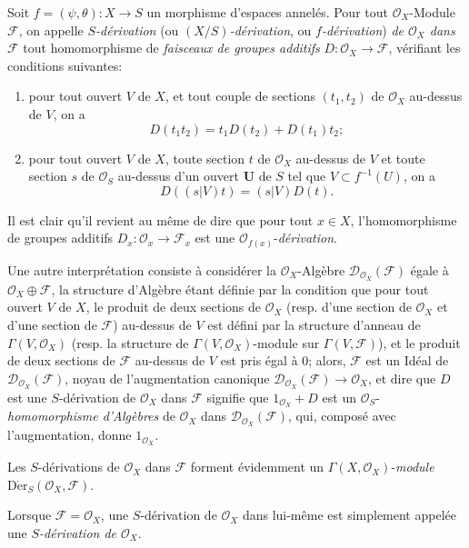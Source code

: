 \begin{env}[16.5.1]
Soit $f=(\psi,\theta):X\to S$ un morphisme d'espaces annelés. Pour tout
$\mathcal{O}_X$-Module $\mathscr{F}$, on appelle \emph{$S$-dérivation}
(ou \emph{$(X/S)$-dérivation}, ou \emph{$f$-dérivation}) \emph{de
$\mathcal{O}_X$ dans $\mathscr{F}$} tout homomorphisme de \emph{faisceaux de
groupes additifs} $D:\mathcal{O}_X\to\mathscr{F}$, vérifiant les conditions
suivantes:
\begin{enumerate}
\item[\emph{a)}] pour tout ouvert $V$ de $X$, et tout couple de sections
$(t_1,t_2)$ de $\mathcal{O}_X$ au-dessus de $V$, on a
\[
  D(t_1t_2)=t_1D(t_2)+D(t_1)t_2;
  \tag{16.5.1.1}
  \label{IV.16.5.1.1}
\]
\item[\emph{b)}] pour tout ouvert $V$ de $X$, toute section $t$ de $\mathcal{O}_X$
au-dessus de $V$ et toute section $s$ de $\mathcal{O}_S$ au-dessus d'un ouvert
$\mathbf{U}$ de $S$ tel que $V\subset f^{-1}(U)$, on a
\[
  D((s|V)t)=(s|V)D(t).
  \tag{16.5.1.2}
  \label{IV.16.5.1.2}
\]
\end{enumerate}

Il est clair qu'il revient au même de dire que pour tout $x\in X$,
l'homomorphisme de groupes additifs
$D_x:\mathcal{O}_x\to\mathscr{F}_x$ est une
$\mathcal{O}_{f(x)}$-\emph{dérivation}.

Une autre interprétation consiste à considérer la $\mathcal{O}_X$-Algèbre
$\mathscr{D}_{\mathcal{O}_X}(\mathscr{F})$ égale à
$\mathcal{O}_X\oplus\mathscr{F}$, la structure d'Algèbre étant définie par la
condition que pour tout ouvert $V$ de $X$, le produit de deux sections de
$\mathcal{O}_X$ (resp. d'une section de $\mathcal{O}_X$ et d'une section de
$\mathscr{F}$) au-dessus de $V$ est défini par la structure d'anneau de
$\Gamma(V,\mathcal{O}_X)$ (resp. la structure de
$\Gamma(V,\mathcal{O}_X)$-module sur $\Gamma(V,\mathscr{F})$), et le produit de
deux sections de $\mathscr{F}$ au-dessus de $V$ est pris égal à 0; alors,
$\mathscr{F}$ est un Idéal de
$\mathscr{D}_{\mathcal{O}_X}(\mathscr{F})$, noyau de l'augmentation canonique
$\mathscr{D}_{\mathcal{O}_X}(\mathscr{F})\to\mathcal{O}_X$, et dire que $D$
est une $S$-dérivation de $\mathcal{O}_X$ dans $\mathscr{F}$ signifie que
$1_{\mathcal{O}_X}+D$ est un $\mathcal{O}_S$-\emph{homomorphisme d'Algèbres} de
$\mathcal{O}_X$ dans $\mathscr{D}_{\mathcal{O}_X}(\mathscr{F})$, qui, composé
avec l'augmentation, donne $1_{\mathcal{O}_X}$.

Les $S$-dérivations de $\mathcal{O}_X$ dans $\mathscr{F}$ forment évidemment
un $\Gamma(X,\mathcal{O}_X)$-\emph{module}
$\operatorname{D\acute{e}r}_S(\mathcal{O}_X,\mathscr{F})$.

Lorsque $\mathscr{F}=\mathcal{O}_X$, une $S$-dérivation de $\mathcal{O}_X$ dans
lui-même est simplement appelée une \emph{$S$-dérivation de $\mathcal{O}_X$}.
\end{env}

